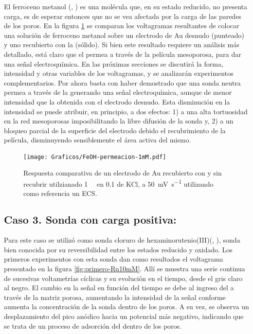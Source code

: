 		El ferroceno metanol (\ferroceno, \fc) es una molécula que, en su estado reducido, no presenta carga, es de esperar entonces que no se vea afectada por la carga de las paredes de los poros. En la figura \ref{fig:permeacion} se comparan los voltagramas resultantes de colocar una solución de ferroceno metanol sobre un electrodo de Au desnudo (punteado) y uno recubierto con la \pdm\space (sólido).  Si bien este resultado  requiere un análisis más detallado, está claro que el \fc\space permea a través de la película mesoporosa, para dar una señal electroquímica. En las próximas secciones se discutirá la forma, intensidad y otras variables de los voltagramas, y se analizarán experimentos complementarios. Por ahora basta con haber demostrado que una sonda neutra permea a través de la \pdm\space generando una señal electroquímica, aunque de menor intensidad que la obtenida con el electrodo desnudo. Esta disminución en la intensidad se puede atribuir, en principio, a dos efectos: 1) a una alta tortuosidad en la red mesoporosas imposibilitando la libre difusión de la sonda y\cite{Etienne2007}, 2) a un bloqueo parcial de la superficie del electrodo debido el recubrimiento de la película, disminuyendo sensiblemente el área activa del mismo\cite{Otal2006}.

		\begin{figure}[ht]
				\centering
		 	    \texttt{[image: Graficos/FeOH-permeacion-1mM.pdf]}
		        \caption[Permeación ferroceno metanol en \pdmF]{Respuesta comparativa de un electrodo de Au recubierto con \pdmF\space y sin recubrir utilzianado \fc\space \SI{1}{\milli\Molar} en \SI{0.1}{\Molar} de KCl, a \SI{50}{\milli\volt\per\second} utilizando como referencia un ECS.}
		        \label{fig:permeacion}
		      	\end{figure}

	\subsection{Caso 3. Sonda con carga positiva: \texorpdfstring{\aminorutenioCompleto}{aminorutenio}}

		Para este caso se utilizó como sonda cloruro de hexaminorutenio(III)\linebreak (\aminorutenioCompleto, \ru), sonda bien conocida por su reversibilidad entre los estados reducido y oxidado. Los primeros experimentos con esta sonda dan como resultados el voltagrama presentado en la figura \ref{fig:primero-Ru10mM}. Allí se muestra una serie continua de sucesivas voltametrías cíclicas y su evolución en el tiempo, desde el gris claro al negro. El cambio en la señal en función del tiempo se debe al ingreso del \ru\space a través de la matriz porosa, aumentando la intensidad de la señal conforme aumenta la concentración de la sonda dentro de los poros. A su vez, se observa un desplazamiento del pico anódico hacia un potencial más negativo, indicando que se trata de un proceso de adsorción del \ru\space dentro de los poros. 
					
